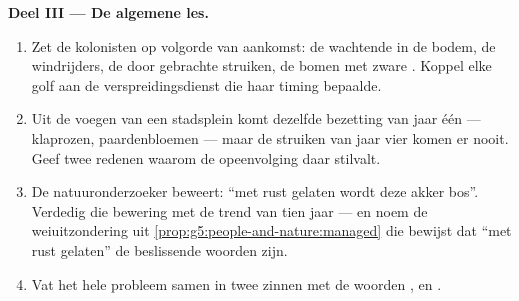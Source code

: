 \begin{problem}
\medskip\noindent\textbf{Deel III --- De algemene les.}
\begin{enumerate}[resume]
  \item Zet de kolonisten op volgorde van aankomst: de wachtende 
        in de bodem, de windrijders, de door  gebrachte struiken,
        de bomen met zware . Koppel elke golf aan de
        verspreidingsdienst die haar timing bepaalde.
  \item Uit de voegen van een stadsplein komt dezelfde bezetting van
        jaar één --- klaprozen, paardenbloemen --- maar de struiken van
        jaar vier komen er nooit. Geef twee redenen waarom de opeenvolging
        daar stilvalt.
  \item De natuuronderzoeker beweert: ``met rust gelaten wordt deze
        akker bos''. Verdedig die bewering met de trend van tien jaar ---
        en noem de weiuitzondering uit
        \cref{prop:g5:people-and-nature:managed} die bewijst dat ``met
        rust gelaten'' de beslissende woorden zijn.
  \item Vat het hele probleem samen in twee zinnen met de woorden
        \emph{}, \emph{} en \emph{}.
\end{enumerate}
\end{problem}
